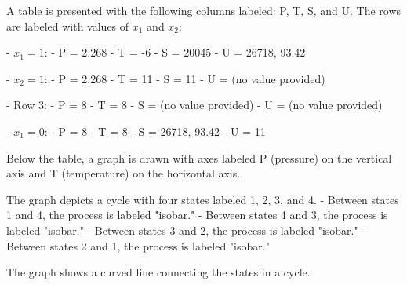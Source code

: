 A table is presented with the following columns labeled: P, T, S, and U. The rows are labeled with values of \( x_1 \) and \( x_2 \):  

- \( x_1 = 1 \):  
  - P = 2.268  
  - T = -6  
  - S = 20045  
  - U = 26718, 93.42  

- \( x_2 = 1 \):  
  - P = 2.268  
  - T = 11  
  - S = 11  
  - U = (no value provided)  

- Row 3:  
  - P = 8  
  - T = 8  
  - S = (no value provided)  
  - U = (no value provided)  

- \( x_1 = 0 \):  
  - P = 8  
  - T = 8  
  - S = 26718, 93.42  
  - U = 11  

Below the table, a graph is drawn with axes labeled P (pressure) on the vertical axis and T (temperature) on the horizontal axis.  

The graph depicts a cycle with four states labeled 1, 2, 3, and 4.  
- Between states 1 and 4, the process is labeled "isobar."  
- Between states 4 and 3, the process is labeled "isobar."  
- Between states 3 and 2, the process is labeled "isobar."  
- Between states 2 and 1, the process is labeled "isobar."  

The graph shows a curved line connecting the states in a cycle.